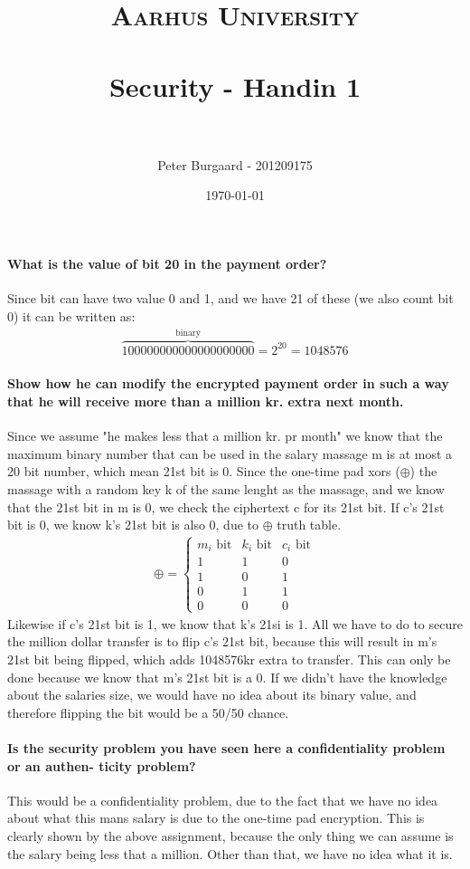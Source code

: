 \documentclass[paper=a4, fontsize=11pt]{scrartcl} %
\title{	
	\normalfont \normalsize 
	\textsc{Aarhus University} \\ [25pt] %
	\horrule{0.5pt} \\[0.4cm] %
	\huge Security - Handin 1 \\ %
	\horrule{2pt} \\[0.5cm] %
}
\author{Peter Burgaard - 201209175} %
\date{\normalsize\today} %
\numberwithin{equation}{section} %
\numberwithin{figure}{section} %
\numberwithin{table}{section} %
\begin{document}
	
	\maketitle %
	
	\paragraph{What is the value of bit 20 in the payment order?}
	Since bit can have two value 0 and 1, and we have 21 of these (we also count bit 0) it can be written as:
	\begin{align*}
	\overbrace{100000000000000000000}^\text{binary}=2^{20}=1048576
	\end{align*}
	\paragraph{Show how he can modify the encrypted payment order in such a way that he will receive more than a million kr. extra next month.} Since we assume "he makes less that a million kr. pr month" we know that the maximum binary number that can be used in the salary massage m is at most a 20 bit number, which mean 21st bit is 0. Since the one-time pad xors ($\oplus$) the massage with a random key k of the same lenght as the massage, and we know that the 21st bit in m is 0, we check the ciphertext c for its 21st bit. If c's 21st bit is 0, we know k's 21st bit is also 0, due to $\oplus$ truth table. 
	\begin{align*}
	\oplus = \left\{ \begin{array}{c|c|c}
		\text{$m_i$ bit} & \text{$k_i$ bit} & \text{$c_i$ bit} \\ \hline
		1 & 1 & 0 \\ \hline
		1 & 0 & 1 \\ \hline
		0 & 1 & 1 \\ \hline
		0 & 0 & 0 
	\end{array} \right.
	\end{align*}
	Likewise if c's 21st bit is 1, we know that k's 21si is 1. All we have to do to secure the million dollar transfer is to flip c's 21st bit, because this will result in m's 21st bit being flipped, which adds 1048576kr extra to transfer. This can only be done because we know that m's 21st bit is a 0. If we didn't have the knowledge about the salaries size, we would have no idea about its binary value, and therefore flipping the bit would be a 50/50 chance. 
	\paragraph{Is the security problem you have seen here a confidentiality problem or an authen- ticity problem?} This would be a confidentiality problem, due to the fact that we have no idea about what this mans salary is due to the one-time pad encryption. This is clearly shown by the above assignment, because the only thing we can assume is the salary being less that a million. Other than that, we have no idea what it is.
\end{document}
